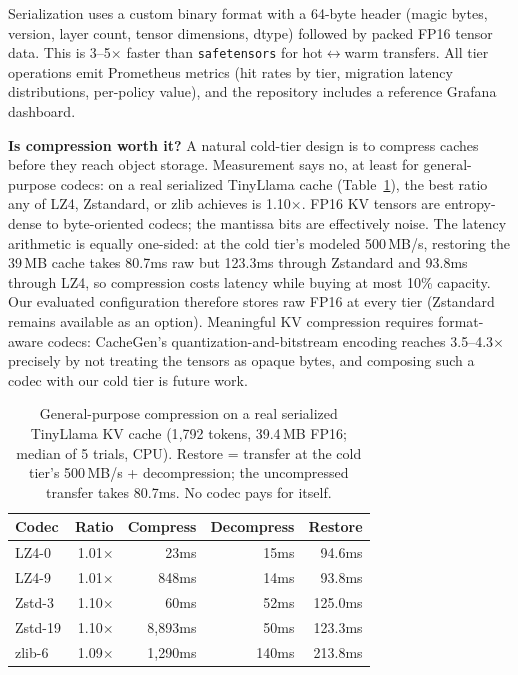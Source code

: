 \documentclass[letterpaper,twocolumn,10pt]{article}
\begin{document}
Serialization uses a custom binary format with a 64-byte header (magic bytes, version, layer count, tensor dimensions, dtype) followed by packed FP16 tensor data. This is 3--5$\times$ faster than \texttt{safetensors} for hot$\leftrightarrow$warm transfers. All tier operations emit Prometheus metrics (hit rates by tier, migration latency distributions, per-policy value), and the repository includes a reference Grafana dashboard.

\label{sec:compression}\textbf{Is compression worth it?} A natural cold-tier design is to compress caches before they reach object storage. Measurement says no, at least for general-purpose codecs: on a real serialized TinyLlama cache (Table~\ref{tab:compression}), the best ratio any of LZ4, Zstandard, or zlib achieves is 1.10$\times$. FP16 KV tensors are entropy-dense to byte-oriented codecs; the mantissa bits are effectively noise. The latency arithmetic is equally one-sided: at the cold tier's modeled 500\,MB/s, restoring the 39\,MB cache takes 80.7ms raw but 123.3ms through Zstandard and 93.8ms through LZ4, so compression costs latency while buying at most 10\% capacity. Our evaluated configuration therefore stores raw FP16 at every tier (Zstandard remains available as an option). Meaningful KV compression requires format-aware codecs: CacheGen's quantization-and-bitstream encoding reaches 3.5--4.3$\times$~\cite{liu2024cachegen} precisely by not treating the tensors as opaque bytes, and composing such a codec with our cold tier is future work.

\begin{table}[t]
\centering
\caption{General-purpose compression on a real serialized TinyLlama KV cache (1{,}792 tokens, 39.4\,MB FP16; median of 5 trials, CPU). Restore = transfer at the cold tier's 500\,MB/s + decompression; the uncompressed transfer takes 80.7ms. No codec pays for itself.}
\label{tab:compression}
\small
\setlength{\tabcolsep}{3.5pt}
\begin{tabular}{@{}lrrrr@{}}
\toprule
Codec & Ratio & Compress & Decompress & Restore \\
\midrule
LZ4-0   & 1.01$\times$ & 23ms    & 15ms  & 94.6ms \\
LZ4-9   & 1.01$\times$ & 848ms   & 14ms  & 93.8ms \\
Zstd-3  & 1.10$\times$ & 60ms    & 52ms  & 125.0ms \\
Zstd-19 & 1.10$\times$ & 8,893ms & 50ms  & 123.3ms \\
zlib-6  & 1.09$\times$ & 1,290ms & 140ms & 213.8ms \\
\bottomrule
\end{tabular}
\end{table}
\end{document}
